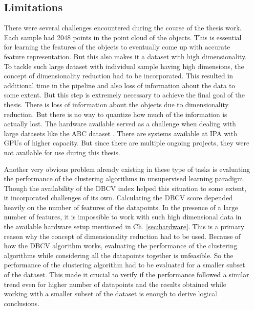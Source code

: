 \subsection{Limitations}
\label{sec:limitations}
There were several challenges encountered during the course of the thesis work. Each sample had 2048 points in the point cloud of the objects. This is essential for learning the features of the objects to eventually come up with accurate feature representation. But this also makes it a dataset with high dimensionality. To tackle such large dataset with individual sample having high dimensions, the concept of dimensionality reduction had to be incorporated. This resulted in additional time in the pipeline and also loss of information about the data to some extent. But this step is extremely necessary to achieve the final goal of the thesis. There is loss of information about the objects due to dimensionality reduction. But there is no way to quantize how much of the information is actually lost. The hardware available served as a challenge when dealing with large datasets like the ABC dataset \cite{Koch_2019_CVPR}. There are systems available at \ac{IPA} with \ac{GPU}s of higher capacity. But since there are multiple ongoing projects, they were not available for use during this thesis.

\vspace{5mm}

Another very obvious problem already existing in these type of tasks is evaluating the performance of the clustering algorithms in unsupervised learning paradigm. Though the availability of the \ac{DBCV} index helped this situation to some extent, it incorporated challenges of its own. Calculating the \ac{DBCV} score depended heavily on the number of features of the datapoints. In the presence of a large number of features, it is impossible to work with such high dimensional data in the available hardware setup mentioned in Ch. \ref{sec:hardware}. This is a primary reason why the concept of dimensionality reduction had to be used. Because of how the \ac{DBCV} algorithm works, evaluating the performance of the clustering algorithms while considering all the datapoints together is unfeasible. So the performance of the clustering algorithm had to be evaluated for a smaller subset of the dataset. This made it crucial to verify if the performance followed a similar trend even for higher number of datapoints and the results obtained while working with a smaller subset of the dataset is enough to derive logical conclusions.

